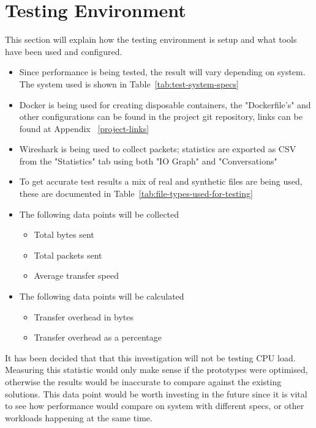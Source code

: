 \section{Testing Environment}\label{sec:testing-environment}
This section will explain how the testing environment is setup and what tools have been used and configured.

\begin{itemize}
	\item Since performance is being tested, the result will vary depending on system. The system used is shown in Table~\ref{tab:test-system-specs}
    \item Docker is being used for creating disposable containers, the "Dockerfile's" and other configurations can be found in the project git repository, links can be found at Appendix~ \ref{project-links}
	\item Wireshark is being used to collect packets; statistics are exported as CSV from the "Statistics" tab using both "IO Graph" and "Conversations"
	\item To get accurate test results a mix of real and synthetic files are being used, these are documented in Table~\ref{tab:file-types-used-for-testing}
	\item The following data points will be collected
	      \begin{itemize}
		      \item Total bytes sent
		      \item Total packets sent
		      \item Average transfer speed
	      \end{itemize}
	\item The following data points will be calculated
	      \begin{itemize}
		      \item Transfer overhead in bytes
		      \item Transfer overhead as a percentage
	      \end{itemize}
\end{itemize}

It has been decided that that this investigation will not be testing CPU load. Measuring this statistic would only make sense if the prototypes were optimised, otherwise the results would be inaccurate to compare against the existing solutions. This data point would be worth investing in the future since it is vital to see how performance would compare on system with different specs, or other workloads happening at the same time.

